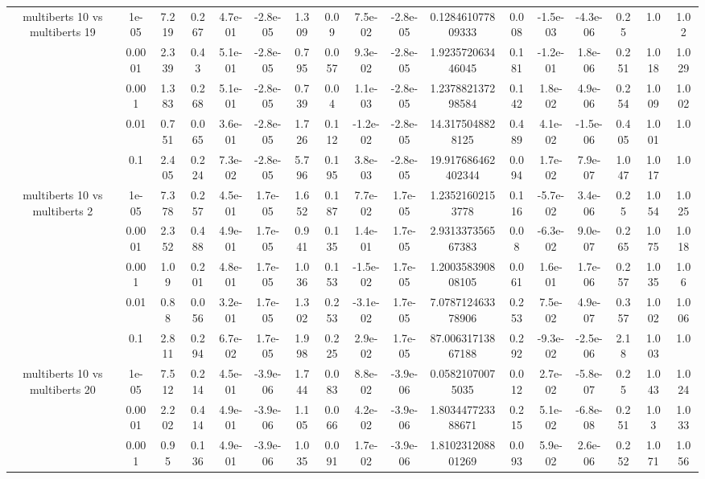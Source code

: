 \begin{tabular}{|c|c|c|c|c|c|c|c|c|c|c|c|c|c|c|c|c|}
\hline
\multirow{5}{*}{multiberts 10 vs multiberts 19} & 1e-05 & 7.219 & 0.267 & 4.7e-01 & -2.8e-05 & 1.309 & 0.09 & 7.5e-02 & -2.8e-05 & 0.128461077809333 & 0.008 & -1.5e-03 & -4.3e-06 & 0.25 & 1.0 & 1.02 \\
 & 0.0001 & 2.339 & 0.43 & 5.1e-01 & -2.8e-05 & 0.795 & 0.057 & 9.3e-02 & -2.8e-05 & 1.923572063446045 & 0.181 & -1.2e-01 & 1.8e-06 & 0.251 & 1.018 & 1.029 \\
 & 0.001 & 1.383 & 0.268 & 5.1e-01 & -2.8e-05 & 0.739 & 0.04 & 1.1e-03 & -2.8e-05 & 1.237882137298584 & 0.142 & 1.8e-02 & 4.9e-06 & 0.254 & 1.009 & 1.002 \\
 & 0.01 & 0.751 & 0.065 & 3.6e-01 & -2.8e-05 & 1.726 & 0.112 & -1.2e-02 & -2.8e-05 & 14.3175048828125 & 0.489 & 4.1e-02 & -1.5e-06 & 0.405 & 1.001 & 1.0 \\
 & 0.1 & 2.405 & 0.224 & 7.3e-02 & -2.8e-05 & 5.796 & 0.195 & 3.8e-03 & -2.8e-05 & 19.917686462402344 & 0.094 & 1.7e-02 & 7.9e-07 & 1.047 & 1.017 & 1.0 \\
\hline
\multirow{5}{*}{multiberts 10 vs multiberts 2} & 1e-05 & 7.378 & 0.257 & 4.5e-01 & 1.7e-05 & 1.652 & 0.187 & 7.7e-02 & 1.7e-05 & 1.23521602153778 & 0.116 & -5.7e-02 & 3.4e-06 & 0.25 & 1.054 & 1.025 \\
 & 0.0001 & 2.352 & 0.488 & 4.9e-01 & 1.7e-05 & 0.941 & 0.135 & 1.4e-01 & 1.7e-05 & 2.931337356567383 & 0.08 & -6.3e-02 & 9.0e-07 & 0.265 & 1.075 & 1.018 \\
 & 0.001 & 1.09 & 0.201 & 4.8e-01 & 1.7e-05 & 1.036 & 0.153 & -1.5e-02 & 1.7e-05 & 1.200358390808105 & 0.061 & 1.6e-01 & 1.7e-06 & 0.257 & 1.035 & 1.06 \\
 & 0.01 & 0.88 & 0.056 & 3.2e-01 & 1.7e-05 & 1.302 & 0.253 & -3.1e-02 & 1.7e-05 & 7.078712463378906 & 0.253 & 7.5e-02 & 4.9e-07 & 0.357 & 1.002 & 1.006 \\
 & 0.1 & 2.811 & 0.294 & 6.7e-02 & 1.7e-05 & 1.998 & 0.225 & 2.9e-02 & 1.7e-05 & 87.00631713867188 & 0.292 & -9.3e-02 & -2.5e-06 & 2.18 & 1.003 & 1.0 \\
\hline
\multirow{5}{*}{multiberts 10 vs multiberts 20} & 1e-05 & 7.512 & 0.214 & 4.5e-01 & -3.9e-06 & 1.744 & 0.083 & 8.8e-02 & -3.9e-06 & 0.05821070075035 & 0.012 & 2.7e-02 & -5.8e-07 & 0.25 & 1.043 & 1.024 \\
 & 0.0001 & 2.202 & 0.414 & 4.9e-01 & -3.9e-06 & 1.105 & 0.066 & 4.2e-02 & -3.9e-06 & 1.803447723388671 & 0.215 & 5.1e-02 & -6.8e-08 & 0.251 & 1.03 & 1.033 \\
 & 0.001 & 0.95 & 0.136 & 4.9e-01 & -3.9e-06 & 1.035 & 0.091 & 1.7e-02 & -3.9e-06 & 1.810231208801269 & 0.093 & 5.9e-02 & 2.6e-06 & 0.252 & 1.071 & 1.056 \\

\end{tabular}
